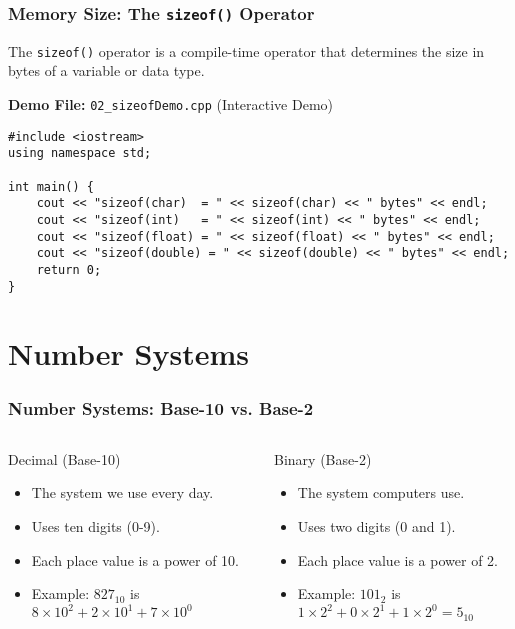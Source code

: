 \documentclass{beamer}
\begin{document}
\begin{frame}[fragile]
\frametitle{Memory Size: The \texttt{sizeof()} Operator}
The \texttt{sizeof()} operator is a compile-time operator that determines the size in \alert{bytes} of a variable or data type.

\vfill

\textbf{Demo File:} \texttt{02\_sizeofDemo.cpp} (Interactive Demo)
\begin{verbatim}
#include <iostream>
using namespace std;

int main() {
    cout << "sizeof(char)  = " << sizeof(char) << " bytes" << endl;
    cout << "sizeof(int)   = " << sizeof(int) << " bytes" << endl;
    cout << "sizeof(float) = " << sizeof(float) << " bytes" << endl;
    cout << "sizeof(double) = " << sizeof(double) << " bytes" << endl;
    return 0;
}
\end{verbatim}
\end{frame}

\section{Number Systems}

\begin{frame}
\frametitle{Number Systems: Base-10 vs. Base-2}
\begin{columns}[T]
    \begin{column}{0.5\textwidth}
        \begin{block}{Decimal (Base-10)}
            \begin{itemize}
                \item The system we use every day.
                \item Uses ten digits (0-9).
                \item Each place value is a power of 10.
                \item Example: $827_{10}$ is\\ $8 \times 10^2 + 2 \times 10^1 + 7 \times 10^0$
            \end{itemize}
        \end{block}
    \end{column}
    \begin{column}{0.5\textwidth}
        \begin{block}{Binary (Base-2)}
            \begin{itemize}
                \item The system computers use.
                \item Uses two digits (0 and 1).
                \item Each place value is a power of 2.
                \item Example: $101_2$ is\\ $1 \times 2^2 + 0 \times 2^1 + 1 \times 2^0 = 5_{10}$
            \end{itemize}
        \end{block}
    \end{column}
\end{columns}
\end{frame}
\end{document}

